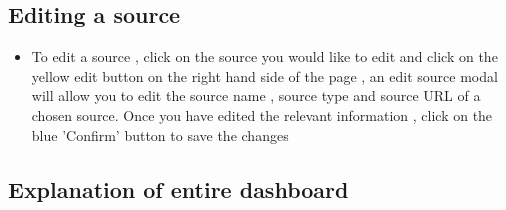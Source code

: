 \documentclass[12pt]{article}
\begin{document}
\subsection{Editing a source}
\begin{itemize}
    \item To edit a source , click on the source you would like to edit and click on the yellow edit button on the right hand side of the page , an edit source modal will allow you to edit the source name , source type and source URL of a chosen source. Once you have edited the relevant information , click on the blue 'Confirm' button to save the changes
\end{itemize}

\newpage



\subsection{Explanation of entire dashboard}
\end{document}

